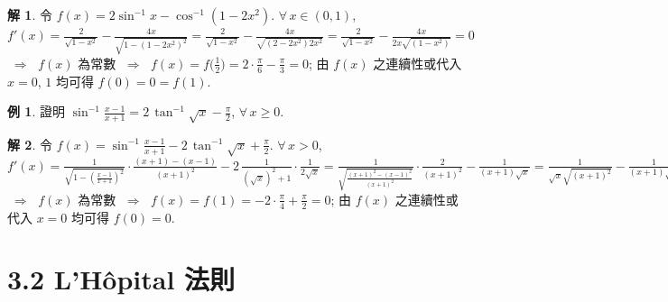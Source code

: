 \documentclass[12pt]{extarticle}
\newcommand{\ds}{\displaystyle}
\newcommand{\ie}{\;\Longrightarrow\;}
\theoremstyle{definition}
\newtheorem*{ex}{例}
\newtheorem*{sol}{解}
\begin{document}
\begin{sol}
  令 $\ds f(x) = 2\sin^{-1}x - \cos^{-1}(1 - 2x^2)$. $\forall\,x\in(0, 1)$, $\ds f'(x) = \frac{2}{\sqrt{1 - x^2}} - \frac{4x}{\sqrt{1 - (1 - 2x^2)^2}} = \frac{2}{\sqrt{1 - x^2}} - \frac{4x}{\sqrt{(2 - 2x^2)2x^2}} = \frac{2}{\sqrt{1 - x^2}} - \frac{4x}{2x\sqrt{(1 - x^2)}} = 0$ $\ie$ $f(x)$ 為常數 $\ie$ $\ds f(x) = f\Big(\frac{1}{2}\Big) = 2\cdot\frac{\pi}{6} - \frac{\pi}{3} = 0$; 由 $f(x)$ 之連續性或代入 $x = 0$, $1$ 均可得 $f(0) = 0 = f(1)$.   
\end{sol}

\begin{ex}
  證明 $\ds\sin^{-1}\frac{x - 1}{x + 1} = 2\,\tan^{-1}\sqrt{x} - \frac{\pi}{2}$, $\forall\,x\geqslant 0$. 
\end{ex}

\begin{sol}
  令 $\ds f(x) = \sin^{-1}\frac{x - 1}{x + 1} - 2\,\tan^{-1}\sqrt{x} + \frac{\pi}{2}$. $\forall\,x > 0$, $\ds f'(x) = \frac{1}{\sqrt{1 - (\frac{x - 1}{x + 1})^2}}\cdot\frac{(x + 1) - (x - 1)}{(x + 1)^2} - 2\,\frac{1}{(\sqrt{x})^2 + 1}\cdot\frac{1}{2\sqrt{x}} = \frac{1}{\sqrt{\frac{(x + 1)^2 - (x - 1)^2}{(x + 1)^2}}}\cdot\frac{2}{(x + 1)^2} - \frac{1}{(x + 1)\sqrt{x}} = \frac{1}{\sqrt{x}\sqrt{(x + 1)^2}} - \frac{1}{(x + 1)\sqrt{x}} = \frac{1}{\sqrt{x}|x + 1|} - \frac{1}{(x + 1)\sqrt{x}} = 0$ $\ie$ $f(x)$ 為常數 $\ie$ $\ds f(x) = f(1) = -2\cdot\frac{\pi}{4} + \frac{\pi}{2} = 0$; 由 $f(x)$ 之連續性或代入 $x = 0$ 均可得 $f(0) = 0$.   
\end{sol}

\section*{3.2 L'H\^opital 法則}
\end{document}
